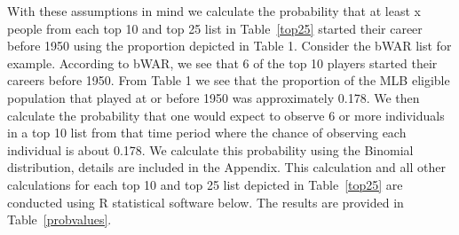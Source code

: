 \documentclass[11pt]{article}\usepackage[]{graphicx}\usepackage[]{color}
\begin{document}
With these assumptions in mind we calculate the probability that at least x 
people from each top 10 and top 25 list in Table~\ref{top25} started their 
career before 1950 using the proportion depicted in Table 1.  Consider the 
bWAR list for example.  According to bWAR, we see that 6 of the top 10 
players started their careers before 1950.  From Table 1 we see that the 
proportion of the MLB eligible population that played at or  
before 1950 was approximately 0.178.  
We then calculate the probability that one would expect to observe 6 or more 
individuals in a top 10 list from that time period where the chance of 
observing each individual is about 0.178.  We calculate 
this probability using the Binomial distribution, details are included in the 
Appendix.  This calculation and all other calculations for each top 10 and 
top 25 list depicted in Table~\ref{top25} are conducted using R statistical 
software below.  The results are provided in Table~\ref{probvalues}. 
\end{document}
